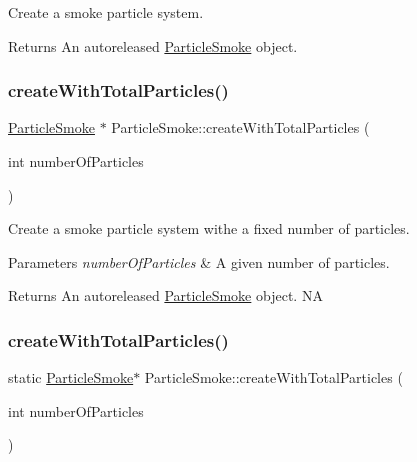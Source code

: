 Create a smoke particle system.

\begin{DoxyReturn}{Returns}
An autoreleased \hyperlink{classParticleSmoke}{Particle\+Smoke} object. 
\end{DoxyReturn}
\mbox{\label{classParticleSmoke_a9fa8e1c0c072063c3879bfa4b142bb0b}} 
\subsubsection{\texorpdfstring{create\+With\+Total\+Particles()}{createWithTotalParticles()}\hspace{0.1cm}{\footnotesize\ttfamily [1/2]}}
{\footnotesize\ttfamily \hyperlink{classParticleSmoke}{Particle\+Smoke} $\ast$ Particle\+Smoke\+::create\+With\+Total\+Particles (\begin{DoxyParamCaption}\item[{int}]{number\+Of\+Particles }\end{DoxyParamCaption})\hspace{0.3cm}{\ttfamily [static]}}

Create a smoke particle system withe a fixed number of particles.


\begin{DoxyParams}{Parameters}
{\em number\+Of\+Particles} & A given number of particles. \\
\hline
\end{DoxyParams}
\begin{DoxyReturn}{Returns}
An autoreleased \hyperlink{classParticleSmoke}{Particle\+Smoke} object.  NA 
\end{DoxyReturn}
\mbox{\label{classParticleSmoke_af9de0fb939e04b27d7393e4ed60a6072}} 
\subsubsection{\texorpdfstring{create\+With\+Total\+Particles()}{createWithTotalParticles()}\hspace{0.1cm}{\footnotesize\ttfamily [2/2]}}
{\footnotesize\ttfamily static \hyperlink{classParticleSmoke}{Particle\+Smoke}$\ast$ Particle\+Smoke\+::create\+With\+Total\+Particles (\begin{DoxyParamCaption}\item[{int}]{number\+Of\+Particles }\end{DoxyParamCaption})\hspace{0.3cm}{\ttfamily [static]}}

